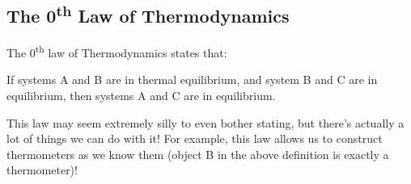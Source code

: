 \subsection{\texorpdfstring{The 0\textsuperscript{th} Law of Thermodynamics}{The 0th Law of Thermodynamics}}
The 0\textsuperscript{th} law of Thermodynamics states that:
\begin{center}
    If systems A and B are in thermal equilibrium, and system B and C are in equilibrium, then systems A and C are in equilibrium.
\end{center}
This law may seem extremely silly to even bother stating, but there's actually a lot of things we can do with it! For example, this law allows us to construct thermometers as we know them (object B in the above definition is exactly a thermometer)!